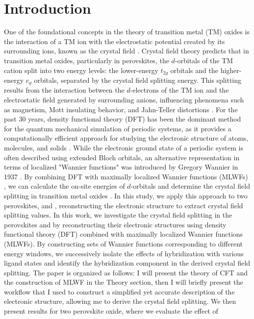 \documentclass[%
 reprint,
 amsmath,amssymb,
 aps,
]{revtex4-2}
\begin{document}
\section{Introduction}
One of the foundational concepts in the theory of transition metal (TM) oxides is the interaction of a TM ion with the electrostatic potential created by its surrounding ions, known as the crystal field \cite{griffith1961theory}. Crystal field theory predicts that in transition metal oxides, particularly in perovskites, the \(d\)-orbitals of the TM cation split into two energy levels: the lower-energy \(t_{2g}\) orbitals and the higher-energy \(e_g\) orbitals, separated by the crystal field splitting energy. This splitting results from the interaction between the \(d\)-electrons of the TM ion and the electrostatic field generated by surrounding anions, influencing phenomena such as magnetism, Mott insulating behavior, and Jahn-Teller distortions \cite{CFT_Theory}.
For the past 30 years, density functional theory (DFT) has been the dominant method for the quantum mechanical simulation of periodic systems, as it provides a computationally efficient approach for studying the electronic structure of atoms, molecules, and solids \cite{DFT}. While the electronic ground state of a periodic system is often described using extended Bloch orbitals, an alternative representation in terms of localized "Wannier functions" was introduced by Gregory Wannier in 1937 \cite{Marzari2012}. By combining DFT with maximally localized Wannier functions (MLWFs) \cite{Marzari1997}, we can calculate the on-site energies of \(d\)-orbitals and determine the crystal field splitting in transition metal oxides \cite{Scaramucci2014}. In this study, we apply this approach to two perovskites,  and , reconstructing the electronic structure to extract crystal field splitting values. 
In this work, we investigate the crystal field splitting in the perovskites  and  by reconstructing their electronic structures using density functional theory (DFT) combined with maximally localized Wannier functions (MLWFs). By constructing sets of Wannier functions corresponding to different energy windows, we successively isolate the effects of hybridization with various ligand states and identify the hybridization component in the derived crystal field splitting.
The paper is organized as follows: I will present the theory of CFT and the construction of MLWF in the Theory section, then I will briefly present the workflow that I used to construct a simplified yet accurate description of the electronic structure, allowing me to derive the crystal field splitting.  We then present results for two perovskite oxide, where we evaluate the effect of
\end{document}
